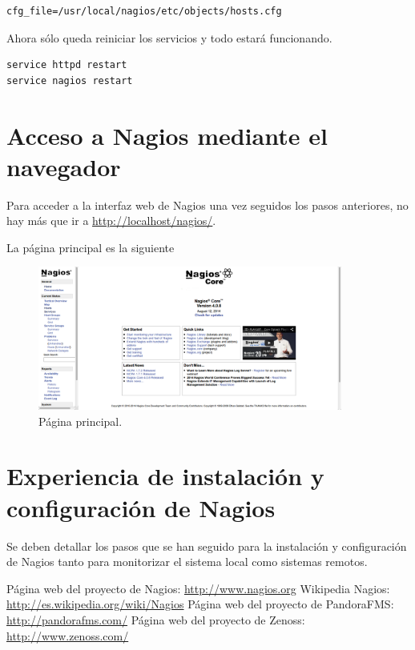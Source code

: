 \documentclass[11pt,a4paper]{article}
\begin{document}
\begin{verbatim}
cfg_file=/usr/local/nagios/etc/objects/hosts.cfg
\end{verbatim}

Ahora sólo queda reiniciar los servicios y todo estará funcionando.

\begin{verbatim}
service httpd restart
service nagios restart
\end{verbatim}

\section{Acceso a Nagios mediante el navegador}

Para acceder a la interfaz web de Nagios una vez seguidos los pasos anteriores, no hay más que ir a \url{http://localhost/nagios/}.

La página principal es la siguiente

\begin{figure}[h!]
  \centering
\includegraphics[width=10cm]{images/0.png} 
  \caption{Página principal.}
\end{figure}

\section{Experiencia de instalación y configuración de Nagios}

Se deben detallar los pasos que se han seguido para la instalación y configuración de Nagios
tanto para monitorizar el sistema local como sistemas remotos.

\begin{thebibliography}{1}

 Página web del proyecto de Nagios: \url{http://www.nagios.org}
 Wikipedia Nagios: \url{http://es.wikipedia.org/wiki/Nagios}
 Página web del proyecto de PandoraFMS: \url{http://pandorafms.com/}
 Página web del proyecto de Zenoss: \url{http://www.zenoss.com/}
\end{thebibliography}
\end{document}
